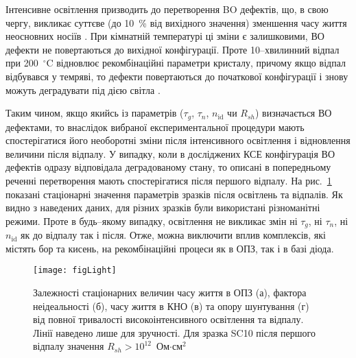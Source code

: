 Інтенсивне освітлення призводить до перетворення BO дефектів, що, в свою
чергу, викликає суттєве (до 10~\% від вихідного значення) зменшення часу життя неосновних носіїв \cite{LIDRev,LIDRev2}.
При кімнатній температурі ці зміни є залишковими, ВО дефекти не повертаються до вихідної конфігурації.
Проте 10--хвилинний відпал при 200~$^\circ$C відновлює рекомбінаційні параметри кристалу, причому
якщо відпал відбувався у темряві, то дефекти повертаються до початкової конфігурації і знову можуть деградувати під
дією світла \cite{BO:Halam2016,LIDRev2,Kim}.

Таким чином, якщо якийсь із параметрів ($\tau_g$, $\tau_n$, $n_{\mathrm{id}}$ чи $R_{sh}$) визначається ВО дефектами,
то внаслідок вибраної експериментальної процедури мають спостерігатися його необоротні зміни після інтенсивного освітлення і відновлення
величини після відпалу.
У випадку, коли в досліджених КСЕ конфігурація ВО дефектів одразу відповідала деградованому стану,
то описані в попередньому реченні перетворення мають спостерігатися після першого відпалу.
На рис.~\ref{figLight} показані стаціонарні значення параметрів зразків після освітлень та відпалів.
Як видно з наведених даних, для різних зразків були використані різноманітні режими.
Проте в будь--якому випадку, освітлення не викликає змін ні $\tau_g$, ні $\tau_n$, ні $n_{\mathrm{id}}$ як до
відпалу так і після.
Отже, можна виключити вплив комплексів, які містять бор та кисень, на рекомбінаційні процеси
як в ОПЗ, так і в базі діода.

\begin{figure}
\center
\texttt{[image: figLight]}
\caption{\label{figLight}
Залежності стаціонарних величин часу життя в ОПЗ (а),  фактора неідеальності (б), часу життя в КНО (в) та  опору шунтування (г) від
повної тривалості високоінтенсивного освітлення та відпалу.
Лінії наведено лише для зручності.
Для зразка SC10 після першого відпалу значення $R_{sh}>10^{12}$~Ом$\cdot$см$^2$
}%
\end{figure}



